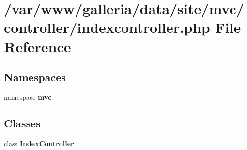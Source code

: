 \section{/var/www/galleria/data/site/mvc/controller/indexcontroller.php File Reference}
\label{indexcontroller_8php}
\subsection*{Namespaces}
\begin{CompactItemize}
\item 
namespace {\bf mvc}
\end{CompactItemize}
\subsection*{Classes}
\begin{CompactItemize}
\item 
class {\bf IndexController}
\end{CompactItemize}

